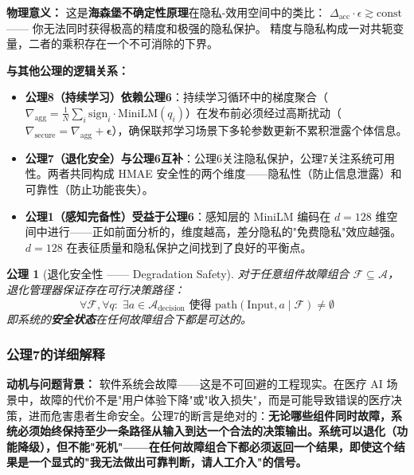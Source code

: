 \documentclass[11pt,a4paper]{ctexart}
\newtheorem{axiom}{公理}[section]
\theoremstyle{remark}
\begin{document}
\textbf{物理意义：} 这是\textbf{海森堡不确定性原理}在隐私-效用空间中的类比：
$\Delta_{\text{acc}} \cdot \epsilon \gtrsim \text{const}$——
你无法同时获得极高的精度和极强的隐私保护。
精度与隐私构成一对共轭变量，二者的乘积存在一个不可消除的下界。

\textbf{与其他公理的逻辑关系：}
\begin{itemize}[nosep]
\item \textbf{公理8（持续学习）依赖公理6}：持续学习循环中的梯度聚合（$\nabla_{\text{agg}} = \frac{1}{N}\sum_i \text{sign}_i \cdot \text{MiniLM}(q_i)$）在发布前必须经过高斯扰动（$\nabla_{\text{secure}} = \nabla_{\text{agg}} + \boldsymbol{\epsilon}$），确保联邦学习场景下多轮参数更新不累积泄露个体信息。
\item \textbf{公理7（退化安全）与公理6互补}：公理6关注隐私保护，公理7关注系统可用性。两者共同构成 HMAE 安全性的两个维度——隐私性（防止信息泄露）和可靠性（防止功能丧失）。
\item \textbf{公理1（感知完备性）受益于公理6}：感知层的 MiniLM 编码在 $d=128$ 维空间中进行——正如前面分析的，维度越高，差分隐私的"免费隐私"效应越强。$d=128$ 在表征质量和隐私保护之间找到了良好的平衡点。
\end{itemize}

\begin{axiom}[退化安全性 —— Degradation Safety]
\label{ax:degradation}
对于任意组件故障组合 $\mathcal{F} \subseteq \mathcal{A}$，
退化管理器保证存在可行决策路径：
\begin{equation}
\forall \mathcal{F}, \forall q:\; \exists a \in \mathcal{A}_{\text{decision}} \text{ 使得 } \text{path}(\text{Input}, a \mid \mathcal{F}) \neq \emptyset
\end{equation}
即系统的\textbf{安全状态}在任何故障组合下都是可达的。
\end{axiom}

\subsubsection{公理7的详细解释}

\textbf{动机与问题背景：} 软件系统会故障——这是不可回避的工程现实。在医疗 AI 场景中，故障的代价不是"用户体验下降"或"收入损失"，而是可能导致错误的医疗决策，进而危害患者生命安全。公理7的断言是绝对的：\textbf{无论哪些组件同时故障，系统必须始终保持至少一条路径从输入到达一个合法的决策输出。系统可以退化（功能降级），但不能"死机"——在任何故障组合下都必须返回一个结果，即使这个结果是一个显式的"我无法做出可靠判断，请人工介入"的信号。}
\end{document}
